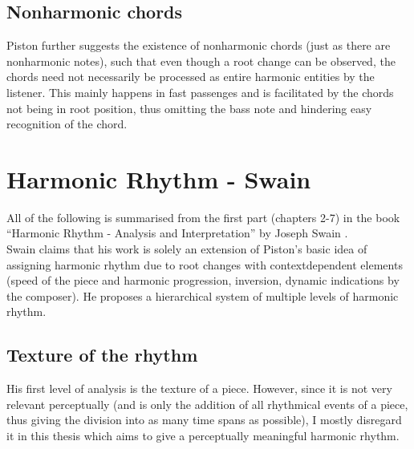 \documentclass[a4paper,12pt]{report}
\begin{document}
\subsection{Nonharmonic chords}
Piston further suggests the existence of nonharmonic chords (just as there are nonharmonic notes), such
that even though a root change can be observed, the chords need not necessarily be processed as
entire harmonic entities by the listener. This mainly happens in fast passenges and is facilitated by the
chords not being in root position, thus omitting the bass note and hindering easy recognition of the
chord.


\section{Harmonic Rhythm - Swain}

All of the following is summarised from the first part (chapters 2-7) in the book ``Harmonic Rhythm -
Analysis and Interpretation'' by Joseph Swain \cite{swain2002harmonic}.\\

Swain claims that his work is solely an extension of Piston's basic idea of assigning harmonic rhythm due
to root changes with contextdependent elements (speed of the piece and harmonic progression, inversion,
dynamic indications by the composer). He proposes a hierarchical system of multiple levels of harmonic
rhythm.

\subsection{Texture of the rhythm}
His first level of analysis is the texture of a piece. However, since it is not very relevant perceptually (and
is only the addition of all rhythmical events of a piece, thus giving the division into as many time spans as
possible), I mostly disregard it in this thesis which aims to give a perceptually meaningful harmonic rhythm.
\end{document}
